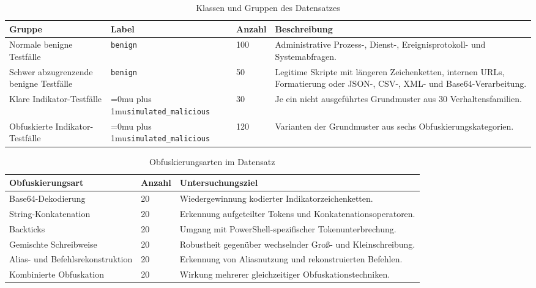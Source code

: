 \documentclass[12pt,a4paper,oneside,parskip=half]{scrreprt}
\newcommand{\codecell}[1]{\begingroup\Urlmuskip=0mu plus 1mu\relax\nolinkurl{#1}\endgroup}
\newcommand{\codebreak}[2]{\codecell{#1#2}}
\begin{document}
\begin{table}[H]
\centering
\caption[Klassen und Gruppen des Datensatzes]{Klassen und Gruppen des Datensatzes}
\label{tab:dataset-groups}
\small
\begin{tabularx}{\textwidth}{|L{3cm}|L{2.5cm}|C{1.5cm}|Y|}
\hline
\textbf{Gruppe} & \textbf{Label} & \textbf{Anzahl} & \textbf{Beschreibung}\\
\hline
Normale benigne Testfälle & \texttt{benign} & 100 & Administrative Prozess-, Dienst-, Ereignisprotokoll- und Systemabfragen.\\
\hline
Schwer abzugrenzende benigne Testfälle & \texttt{benign} & 50 & Legitime Skripte mit längeren Zeichenketten, internen URLs, Formatierung oder JSON-, CSV-, XML- und Base64-Verarbeitung.\\
\hline
Klare Indikator-Testfälle & \codebreak{simulated}{\_malicious} & 30 & Je ein nicht ausgeführtes Grundmuster aus 30 Verhaltensfamilien.\\
\hline
Obfuskierte Indikator-Testfälle & \codebreak{simulated}{\_malicious} & 120 & Varianten der Grundmuster aus sechs Obfuskierungskategorien.\\
\hline
\end{tabularx}
\end{table}

\begin{table}[H]
\centering
\caption[Obfuskierungsarten im Datensatz]{Obfuskierungsarten im Datensatz}
\label{tab:obfuscation-groups}
\small
\begin{tabularx}{\textwidth}{|L{4cm}|C{1.5cm}|Y|}
\hline
\textbf{Obfuskierungsart} & \textbf{Anzahl} & \textbf{Untersuchungsziel}\\
\hline
Base64-Dekodierung & 20 & Wiedergewinnung kodierter Indikatorzeichenketten.\\
\hline
String-Konkatenation & 20 & Erkennung aufgeteilter Tokens und Konkatenationsoperatoren.\\
\hline
Backticks & 20 & Umgang mit PowerShell-spezifischer Tokenunterbrechung.\\
\hline
Gemischte Schreibweise & 20 & Robustheit gegenüber wechselnder Groß- und Kleinschreibung.\\
\hline
Alias- und Befehlsrekonstruktion & 20 & Erkennung von Aliasnutzung und rekonstruierten Befehlen.\\
\hline
Kombinierte Obfuskation & 20 & Wirkung mehrerer gleichzeitiger Obfuskationstechniken.\\
\hline
\end{tabularx}
\end{table}
\end{document}
